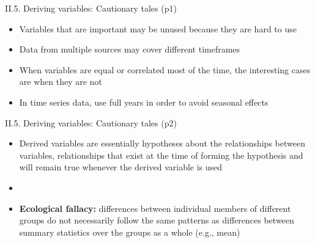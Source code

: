 \documentclass[handout]{beamer}
\newcommand{\strong}[1]{\textbf{\color{teal} #1}}
\begin{document}
\begin{frame}{II.5. Deriving variables: Cautionary tales (p1)}
\begin{itemize}
\item Variables that are important may be unused because they are hard to use
\item Data from multiple sources may cover different timeframes
\item When variables are equal or correlated most of the time, the interesting cases are when they are not
\item In time series data, use full years in order to avoid seasonal effects
\end{itemize}
\end{frame}
\begin{frame}{II.5. Deriving variables: Cautionary tales (p2)}
\begin{itemize}
\item Derived variables are essentially hypotheses about the relationships between variables, relationships that exist at the time of forming the hypothesis and will remain true whenever the derived variable is used
\item[]
\item \strong{Ecological fallacy:} differences between individual members of different groups do not necessarily follow the same patterns as differences between summary statistics over the groups as a whole (e.g., mean)
\end{itemize}
\end{frame}



\end{document}
